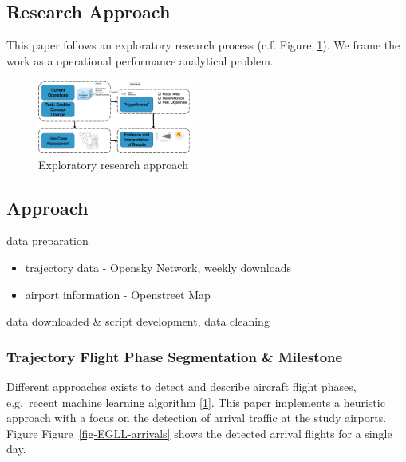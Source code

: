 \documentclass[letterpaper, 10 pt, journal, twoside]{IEEEtran}
\providecommand{\tightlist}{%
  \setlength{\itemsep}{0pt}\setlength{\parskip}{0pt}}\usepackage{longtable,booktabs,array}
\begin{document}
\hypertarget{research-approach}{%
\subsection{Research Approach}\label{research-approach}}

This paper follows an exploratory research process (c.f.
Figure~\ref{fig-research-approach}). We frame the work as a operational
performance analytical problem.

\begin{figure}

{\centering \includegraphics[width=0.45\textwidth,height=\textheight]{./figures/exploratory-research-concept.png}

}

\caption{\label{fig-research-approach}Exploratory research approach}

\end{figure}

\hypertarget{approach}{%
\subsection{Approach}\label{approach}}

data preparation

\begin{itemize}
\tightlist
\item
  trajectory data - Opensky Network, weekly downloads
\item
  airport information - Openstreet Map
\end{itemize}

data downloaded \& script development, data cleaning

\hypertarget{trajectory-flight-phase-segmentation-milestone}{%
\subsubsection{Trajectory Flight Phase Segmentation \&
Milestone}\label{trajectory-flight-phase-segmentation-milestone}}

Different approaches exists to detect and describe aircraft flight
phases, e.g.~recent machine learning algorithm
\protect\hyperlink{ref-sun2017flightphase}{{[}1{]}}. This paper
implements a heuristic approach with a focus on the detection of arrival
traffic at the study airports. Figure Figure~\ref{fig-EGLL-arrivals}
shows the detected arrival flights for a single day.
\end{document}
